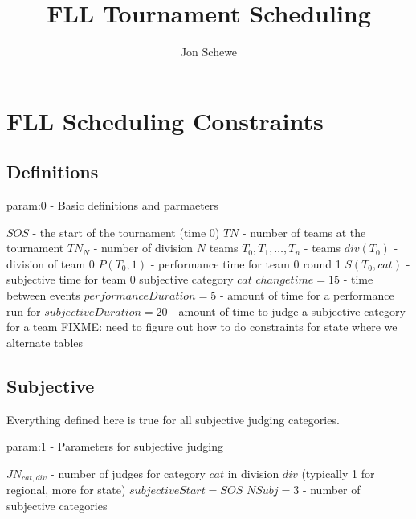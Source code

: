 \documentclass[letterpaper,11pt]{report}
\title{FLL Tournament Scheduling}
\author{Jon Schewe}
\begin{document}
\maketitle

\chapter{FLL Scheduling Constraints}

\section{Definitions}

\begin{algorithm}
\caption{param:0 - Basic definitions and parmaeters}
\begin{algorithmic}
\STATE $SOS$ - the start of the tournament (time 0)
\STATE $TN$ - number of teams at the tournament
\STATE $TN_{N}$ - number of division $N$ teams
\STATE $T_{0}, T_{1}, \dots, T_{n}$ - teams
\STATE $div(T_{0})$ - division of team 0
\STATE $P(T_{0}, 1)$ - performance time for team 0 round 1
\STATE $S(T_{0}, cat)$ - subjective time for team 0 subjective category $cat$
\STATE $changetime = 15$ - time between events
\STATE $performanceDuration = 5$ - amount of time for a performance run for
\STATE $subjectiveDuration = 20$ - amount of time to judge a subjective
category for a team
\COMMENT FIXME: need to figure out how to do constraints for state where we
alternate tables
\end{algorithmic}
\end{algorithm}

\FloatBarrier
\section{Subjective}

Everything defined here is true for all subjective judging categories.

\begin{algorithm}
\caption{param:1 - Parameters for subjective judging}
\begin{algorithmic}
\STATE $JN_{cat,div}$ - number of judges for category $cat$ in division
$div$ (typically 1 for regional, more for state)
\STATE $subjectiveStart = SOS$
\STATE $NSubj = 3$ - number of subjective categories
\end{algorithmic}
\end{algorithm}
\end{document}
